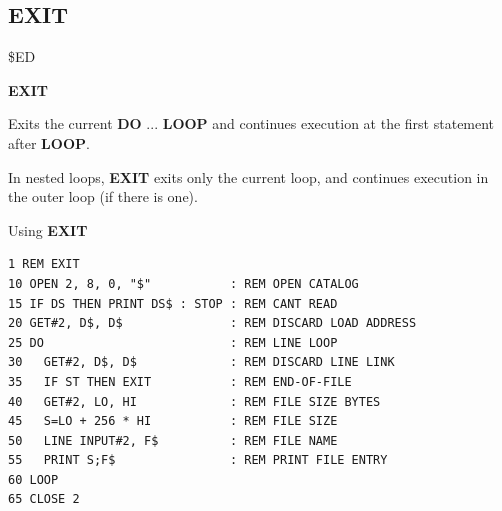 \subsection{EXIT}
\begin{description}[leftmargin=2cm,style=nextline]
\item [Token:]    \$ED

\item [Format:]   {\bf EXIT}

\item [Usage:]    Exits the current {\bf DO} ... {\bf LOOP} and continues execution at the first statement after {\bf LOOP}.

\item [Remarks:]  In nested loops, {\bf EXIT} exits only the current loop, and continues execution in the outer loop (if there is one).

\item [Example:]  Using {\bf EXIT}

\begin{tcolorbox}[colback=black,coltext=white]
\verbatimfont{\codefont}
\begin{verbatim}
1 REM EXIT
10 OPEN 2, 8, 0, "$"           : REM OPEN CATALOG
15 IF DS THEN PRINT DS$ : STOP : REM CANT READ
20 GET#2, D$, D$               : REM DISCARD LOAD ADDRESS
25 DO                          : REM LINE LOOP
30   GET#2, D$, D$             : REM DISCARD LINE LINK
35   IF ST THEN EXIT           : REM END-OF-FILE
40   GET#2, LO, HI             : REM FILE SIZE BYTES
45   S=LO + 256 * HI           : REM FILE SIZE
50   LINE INPUT#2, F$          : REM FILE NAME
55   PRINT S;F$                : REM PRINT FILE ENTRY
60 LOOP
65 CLOSE 2
\end{verbatim}
\end{tcolorbox}
\end{description}


\newpage
